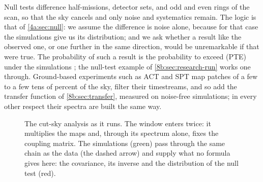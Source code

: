 Null tests difference half-missions, detector sets, and odd and even rings of the scan, so that the
sky cancels and only noise and systematics remain. The logic is that of \cref{4a:sec:null}: we assume
the difference is noise alone, because for that case the simulations give us its distribution; and we
ask whether a result like the observed one, or one further in the same direction, would be
unremarkable if that were true. The probability of such a result is the probability to exceed (PTE)
under the simulations \cite{Planck2018V}; the null-test example of \cref{8b:sec:research-run} works one
through.
Ground-based experiments such as ACT and SPT map patches of a few to a few tens of percent of the sky,
filter their timestreams, and so add the transfer function of \cref{8b:sec:transfer}, measured on
noise-free simulations; in every other respect their spectra are built the same way.

\begin{figure}[htbp]
\centering
{}
\caption{The cut-sky analysis as it runs. The window enters twice: it multiplies the maps and, through
its spectrum alone, fixes the coupling matrix. The simulations (green) pass through the same chain as the
data (the dashed arrow) and supply what no formula gives here: the covariance, its inverse and the
distribution of the null test (red).}
\label{8b:fig:pipeline-flow}
\end{figure}

